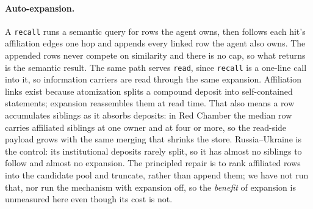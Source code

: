 \documentclass{article}
\newcommand{\code}[1]{\texttt{\small #1}}
\begin{document}
\paragraph{Auto-expansion.} A \code{recall} runs a semantic query for
\ExpBaseK{} rows the agent owns, then follows each hit's affiliation edges one
hop and appends every linked row the agent also owns. The appended rows never
compete on similarity and there is no cap, so what returns is
\ExpAmpRange{} the semantic result. The same path serves \code{read}, since
\code{recall} is a one-line call into it, so information carriers are read
through the same expansion. Affiliation links exist because atomization splits a
compound deposit into self-contained statements; expansion reassembles them at
read time. That also means a row accumulates siblings as it absorbs deposits:
in Red Chamber the median row carries \AffRcLow{} affiliated siblings at one
owner and \AffRcHigh{} at four or more, so the read-side payload grows with the
same merging that shrinks the store. Russia--Ukraine is the control: its
institutional deposits rarely split, so it has almost no siblings to follow and
almost no expansion. The principled repair is to rank affiliated rows into the
candidate pool and truncate, rather than append them; we have not run that, nor
run the mechanism with expansion off, so the \emph{benefit} of expansion is
unmeasured here even though its cost is not.
\end{document}
